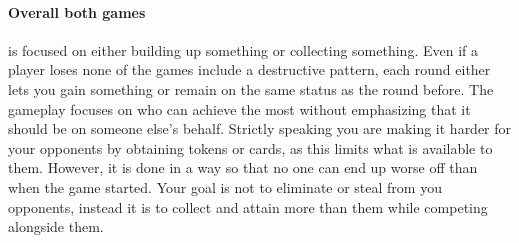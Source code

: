 \documentclass[a4paper]{article}
\begin{document}
\paragraph{Overall both games} is focused on either building up something or collecting something. 
Even if a player loses none of the games include a destructive pattern, each round either lets you gain something or remain on the same status as the round before. 
The gameplay focuses on who can achieve the most without emphasizing that it should be on someone else's behalf. 
Strictly speaking you are making it harder for your opponents by obtaining tokens or cards, as this limits what is available to them. 
However, it is done in a way so that no one can end up worse off than when the game started. 
Your goal is not to eliminate or steal from you opponents, instead it is to collect and attain more than them while competing alongside them.

\newpage


\end{document}
